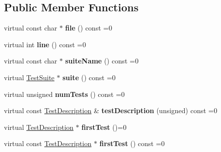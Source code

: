 \subsection*{Public Member Functions}
\begin{DoxyCompactItemize}
\item 
\hypertarget{classCxxTest_1_1SuiteDescription_a855f2fb64ca809625224b30cfe4f1974}{virtual const char $\ast$ {\bfseries file} () const =0}\label{classCxxTest_1_1SuiteDescription_a855f2fb64ca809625224b30cfe4f1974}

\item 
\hypertarget{classCxxTest_1_1SuiteDescription_a63d4c89490ad9dc157e106d82876b015}{virtual int {\bfseries line} () const =0}\label{classCxxTest_1_1SuiteDescription_a63d4c89490ad9dc157e106d82876b015}

\item 
\hypertarget{classCxxTest_1_1SuiteDescription_a64a058e3acb2902b324e73ff9e520f1f}{virtual const char $\ast$ {\bfseries suite\-Name} () const =0}\label{classCxxTest_1_1SuiteDescription_a64a058e3acb2902b324e73ff9e520f1f}

\item 
\hypertarget{classCxxTest_1_1SuiteDescription_aded85c217f1ec960fec7aa406498bf01}{virtual \hyperlink{classCxxTest_1_1TestSuite}{Test\-Suite} $\ast$ {\bfseries suite} () const =0}\label{classCxxTest_1_1SuiteDescription_aded85c217f1ec960fec7aa406498bf01}

\item 
\hypertarget{classCxxTest_1_1SuiteDescription_a44b143cfe80d2e44a6ce46239f1bb043}{virtual unsigned {\bfseries num\-Tests} () const =0}\label{classCxxTest_1_1SuiteDescription_a44b143cfe80d2e44a6ce46239f1bb043}

\item 
\hypertarget{classCxxTest_1_1SuiteDescription_a311342d3ec513390057af290d7837a67}{virtual const \hyperlink{classCxxTest_1_1TestDescription}{Test\-Description} \& {\bfseries test\-Description} (unsigned) const =0}\label{classCxxTest_1_1SuiteDescription_a311342d3ec513390057af290d7837a67}

\item 
\hypertarget{classCxxTest_1_1SuiteDescription_a2f5d8c1327c616d7fa6ca5a14eebf9ae}{virtual \hyperlink{classCxxTest_1_1TestDescription}{Test\-Description} $\ast$ {\bfseries first\-Test} ()=0}\label{classCxxTest_1_1SuiteDescription_a2f5d8c1327c616d7fa6ca5a14eebf9ae}

\item 
\hypertarget{classCxxTest_1_1SuiteDescription_a55a5872d75d39324cee7688872dedd8b}{virtual const \hyperlink{classCxxTest_1_1TestDescription}{Test\-Description} $\ast$ {\bfseries first\-Test} () const =0}\label{classCxxTest_1_1SuiteDescription_a55a5872d75d39324cee7688872dedd8b}


\end{DoxyCompactItemize}

